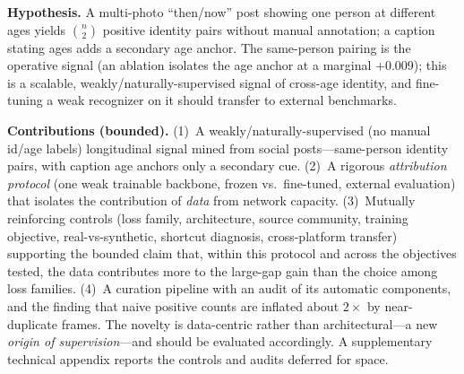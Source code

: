 \documentclass[letterpaper]{article} %
\begin{document}
\textbf{Hypothesis.} A multi-photo ``then/now'' post showing one person at different ages yields $\binom{n}{2}$ positive identity pairs without manual annotation; a caption stating ages adds a secondary age anchor. The same-person pairing is the operative signal (an ablation isolates the age anchor at a marginal $+$0.009); this is a scalable, weakly/naturally-supervised signal of cross-age identity, and fine-tuning a weak recognizer on it should transfer to external benchmarks.

\textbf{Contributions (bounded).}
(1)~A weakly/naturally-supervised (no manual id/age labels) longitudinal signal mined from social posts---same-person identity pairs, with caption age anchors only a secondary cue.
(2)~A rigorous \emph{attribution protocol} (one weak trainable backbone, frozen vs.\ fine-tuned, external evaluation) that isolates the contribution of \emph{data} from network capacity.
(3)~Mutually reinforcing controls (loss family, architecture, source community, training objective, real-vs-synthetic, shortcut diagnosis, cross-platform transfer) supporting the bounded claim that, within this protocol and across the objectives tested, the data contributes more to the large-gap gain than the choice among loss families.
(4)~A curation pipeline with an audit of its automatic components, and the finding that naive positive counts are inflated about $2\times$ by near-duplicate frames.
The novelty is data-centric rather than architectural---a new \emph{origin of supervision}---and should be evaluated accordingly. A supplementary technical appendix reports the controls and audits deferred for space.
\end{document}
